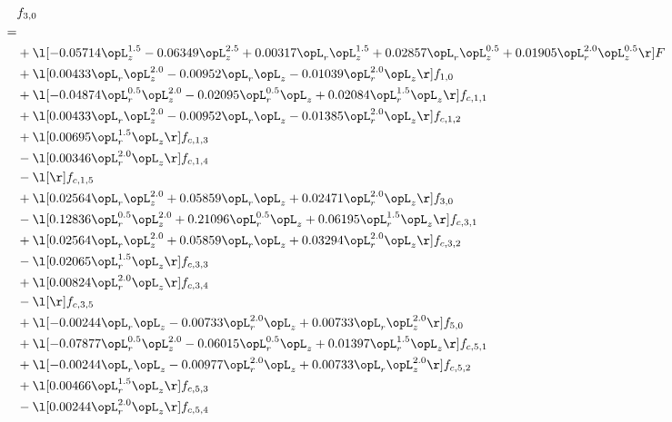\begin{alignat}{2} 
\label{eq:f_30_1} 
& f_{3,0} \nonumber \\ 
 = \\ 
& + \l[  -0.05714 \opL_z^{1.5}   -0.06349 \opL_z^{2.5} +  0.00317 \opL_r \opL_z^{1.5} +  0.02857 \opL_r \opL_z^{0.5} +  0.01905 \opL_r^{2.0} \opL_z^{0.5}  \r] F \nonumber \\ 
& + \l[  0.00433 \opL_r \opL_z^{2.0}   -0.00952 \opL_r \opL_z   -0.01039 \opL_r^{2.0} \opL_z  \r] f_{1,0} \nonumber \\ 
& + \l[  -0.04874 \opL_r^{0.5} \opL_z^{2.0}   -0.02095 \opL_r^{0.5} \opL_z +  0.02084 \opL_r^{1.5} \opL_z  \r] f_{c,1,1} \nonumber \\ 
& + \l[  0.00433 \opL_r \opL_z^{2.0}   -0.00952 \opL_r \opL_z   -0.01385 \opL_r^{2.0} \opL_z  \r] f_{c,1,2} \nonumber \\ 
& + \l[  0.00695 \opL_r^{1.5} \opL_z  \r] f_{c,1,3} \nonumber \\ 
& - \l[  0.00346 \opL_r^{2.0} \opL_z  \r] f_{c,1,4} \nonumber \\ 
& - \l[  \r] f_{c,1,5} \nonumber \\ 
& + \l[  0.02564 \opL_r \opL_z^{2.0} +  0.05859 \opL_r \opL_z +  0.02471 \opL_r^{2.0} \opL_z  \r] f_{3,0} \nonumber \\ 
& - \l[  0.12836 \opL_r^{0.5} \opL_z^{2.0} +  0.21096 \opL_r^{0.5} \opL_z +  0.06195 \opL_r^{1.5} \opL_z  \r] f_{c,3,1} \nonumber \\ 
& + \l[  0.02564 \opL_r \opL_z^{2.0} +  0.05859 \opL_r \opL_z +  0.03294 \opL_r^{2.0} \opL_z  \r] f_{c,3,2} \nonumber \\ 
& - \l[  0.02065 \opL_r^{1.5} \opL_z  \r] f_{c,3,3} \nonumber \\ 
& + \l[  0.00824 \opL_r^{2.0} \opL_z  \r] f_{c,3,4} \nonumber \\ 
& - \l[  \r] f_{c,3,5} \nonumber \\ 
& + \l[  -0.00244 \opL_r \opL_z   -0.00733 \opL_r^{2.0} \opL_z +  0.00733 \opL_r \opL_z^{2.0}  \r] f_{5,0} \nonumber \\ 
& + \l[  -0.07877 \opL_r^{0.5} \opL_z^{2.0}   -0.06015 \opL_r^{0.5} \opL_z +  0.01397 \opL_r^{1.5} \opL_z  \r] f_{c,5,1} \nonumber \\ 
& + \l[  -0.00244 \opL_r \opL_z   -0.00977 \opL_r^{2.0} \opL_z +  0.00733 \opL_r \opL_z^{2.0}  \r] f_{c,5,2} \nonumber \\ 
& + \l[  0.00466 \opL_r^{1.5} \opL_z  \r] f_{c,5,3} \nonumber \\ 
& - \l[  0.00244 \opL_r^{2.0} \opL_z  \r] f_{c,5,4} \nonumber \\ 

\end{alignat}
